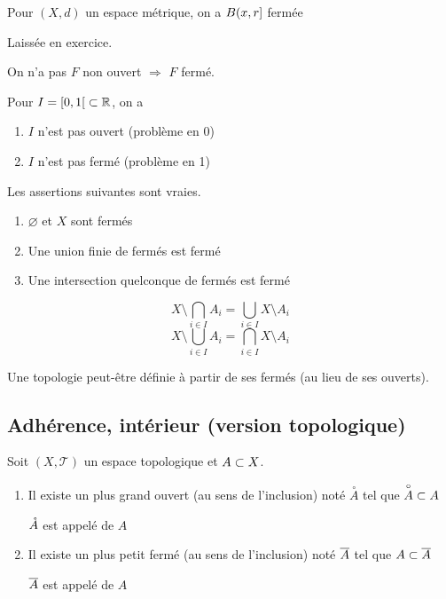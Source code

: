 \documentclass[french,a4paper,10pt]{article}
\begin{document}
	\begin{example} 
		Pour $(X, d)$ un espace métrique, on a $B({x, r}\mathopen{}]\mathclose{}$ fermée
	\end{example}
	\begin{myproof}
	Laissée en exercice.
	\end{myproof}
	
	\begin{remark}
		On n'a pas $F$ non ouvert $\Longrightarrow$ $F$ fermé.
	\end{remark}
	\begin{example}
		Pour $I = \mathopen{[}0, 1\mathclose{[}\subset\mathbb{R}$, on a
		\begin{enumerate}
			\item $I$ n'est pas ouvert (problème en 0)
			\item $I$ n'est pas fermé (problème en 1)
		\end{enumerate}
	\end{example}
	
	\begin{proposition}
		Les assertions suivantes sont vraies.
		\begin{enumerate}
			\item $\varnothing$ et $X$ sont fermés
			\item Une union finie de fermés est fermé
			\item Une intersection quelconque de fermés est fermé
		\end{enumerate}
	\end{proposition}
	\begin{rappel}
		\[
		X\setminus\bigcap_{i\in I}A_i=\bigcup_{i\in I} X\setminus A_i
		\]
		\[
		X\setminus\bigcup_{i\in I}A_i=\bigcap_{i\in I} X\setminus A_i
		\]
	\end{rappel}
	
	
	\begin{remark}
		Une topologie peut-être définie à partir de ses fermés (au lieu de ses ouverts).
	\end{remark}
	
	\subsection{Adhérence, intérieur (version topologique)}
	
	\begin{propdef}
		Soit $(X, \mathcal{T})$ un espace topologique et $A\subset X$.
		\begin{enumerate}
			\item Il existe un plus grand ouvert (au sens de l'inclusion) noté $ \overset{\circ}A$ tel que $\overset{\circ}A\subset A$
			
			$\mathring{A}$ est appelé  de $A$
			
			\item Il existe un plus petit fermé (au sens de l'inclusion) noté $ \overline{A}$ tel que $A\subset \overline{A}$
			
			$\overline{A}$ est appelé  de $A$
		\end{enumerate}
	\end{propdef}
	
\end{document}
